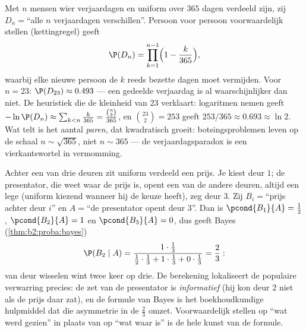 \begin{example}\label{ex:b2:proba:birthday}
Met $n$ mensen wier verjaardagen  en uniform over
$365$ dagen verdeeld zijn, zij $D_n = {}$``alle $n$ verjaardagen
verschillen''. Persoon voor persoon voorwaardelijk stellen
(kettingregel) geeft
\[
\P(D_n) = \prod_{k=1}^{n-1}\Bigl(1 - \frac{k}{365}\Bigr),
\]
waarbij elke nieuwe persoon de $k$ reeds bezette dagen moet
vermijden. Voor $n = 23$: $\P(D_{23}) \approx 0.493$ --- een
gedeelde verjaardag is al waarschijnlijker dan niet. De heuristiek
die de kleinheid van $23$ verklaart: logaritmen nemen geeft $-\ln
\P(D_n) \approx \sum_{k<n}\frac k{365} = \frac{\binom n2}{365}$, en
$\binom{23}2 = 253$ geeft $253/365 \approx 0.693 \approx \ln 2$.
Wat telt is het aantal \emph{paren}, dat kwadratisch groeit:
botsingsproblemen leven op de schaal $n \sim \sqrt{365}$, niet $n
\sim 365$ --- de verjaardagsparadox is een vierkantswortel in
vermomming.
\end{example}

\begin{example}\label{ex:b2:proba:montyhall}
Achter een van drie deuren zit uniform verdeeld een prijs. Je kiest
deur $1$; de presentator, die weet waar de prijs is, opent een van
de andere deuren, altijd een lege (uniform kiezend wanneer hij de
keuze heeft), zeg deur $3$. Zij $B_i = {}$``prijs achter deur $i$''
en $A = {}$``de presentator opent deur $3$''. Dan is
$\pcond{B_1}{A} = \frac12$, $\pcond{B_2}{A} = 1$ en
$\pcond{B_3}{A} = 0$, dus geeft Bayes
(\cref{thm:b2:proba:bayes})
\[
\P(B_2 \mid A)
= \frac{1\cdot\frac13}
{\frac12\cdot\frac13 + 1\cdot\frac13 + 0\cdot\frac13}
= \frac23 :
\]
van deur wisselen wint twee keer op drie. De berekening lokaliseert
de populaire verwarring precies: de zet van de presentator is
\emph{informatief} (hij kon deur $2$ niet  als de prijs daar
zat), en de formule van Bayes is het boekhoudkundige hulpmiddel dat
die asymmetrie in de $\frac23$ omzet. Voorwaardelijk stellen op
``wat werd gezien'' in plaats van op ``wat waar is'' is de hele
kunst van de formule.
\end{example}

